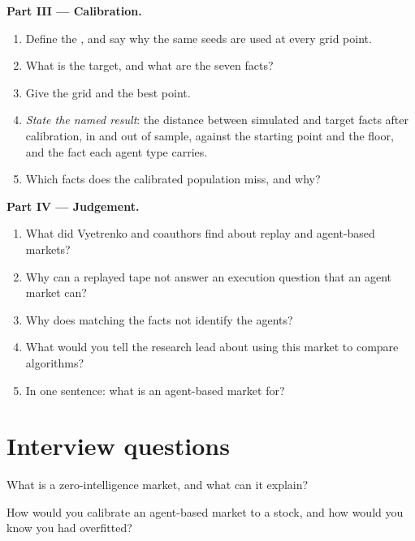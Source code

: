 \begin{problem}
\medskip\noindent\textbf{Part III --- Calibration.}
\begin{enumerate}[resume]
\item Define the , and say why the same seeds are used at every grid point.
\item What is the target, and what are the seven facts?
\item Give the grid and the best point.
\item \emph{State the named result}: the distance between simulated and target facts after calibration, in and out of sample, against the starting
point and the floor, and the fact each agent type carries.
\item Which facts does the calibrated population miss, and why?
\end{enumerate}

\medskip\noindent\textbf{Part IV --- Judgement.}
\begin{enumerate}[resume]
\item What did Vyetrenko and coauthors find about replay and agent-based markets?
\item Why can a replayed tape not answer an execution question that an agent market can?
\item Why does matching the facts not identify the agents?
\item What would you tell the research lead about using this market to compare algorithms?
\item In one sentence: what is an agent-based market for?
\end{enumerate}
\end{problem}

\section{Interview questions}

\begin{interviewq}\label{iq:mx:build-an-agent-based-market:1}
What is a zero-intelligence market, and what can it explain?
\end{interviewq}

\begin{interviewq}\label{iq:mx:build-an-agent-based-market:2}
How would you calibrate an agent-based market to a stock, and how would you know you had overfitted?
\end{interviewq}

